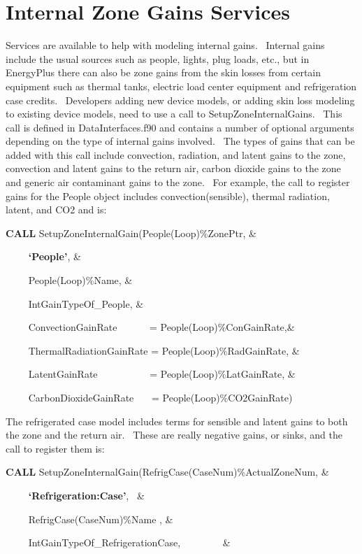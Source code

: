 \section{Internal Zone Gains Services}\label{internal-zone-gains-services}

Services are available to help with modeling internal gains.~ Internal gains include the usual sources such as people, lights, plug loads, etc., but in EnergyPlus there can also be zone gains from the skin losses from certain equipment such as thermal tanks, electric load center equipment and refrigeration case credits.~ Developers adding new device models, or adding skin loss modeling to existing device models, need to use a call to SetupZoneInternalGains.~ This call is defined in DataInterfaces.f90 and contains a number of optional arguments depending on the type of internal gains involved.~ The types of gains that can be added with this call include convection, radiation, and latent gains to the zone, convection and latent gains to the return air, carbon dioxide gains to the zone and generic air contaminant gains to the zone.~ For example, the call to register gains for the People object includes convection(sensible), thermal radiation, latent, and CO2 and is:

\textbf{CALL} SetupZoneInternalGain(People(Loop)\%ZonePtr, \&

~~~~ \textbf{`People'}, \&

~~~~ People(Loop)\%Name, \&

~~~~ IntGainTypeOf\_People, \&

~~~~ ConvectionGainRate~~~~~~ = People(Loop)\%ConGainRate,\&

~~~~ ThermalRadiationGainRate = People(Loop)\%RadGainRate, \&

~~~~ LatentGainRate~~~~~~~~~~ = People(Loop)\%LatGainRate, \&

~~~~ CarbonDioxideGainRate~~~ = People(Loop)\%CO2GainRate)

The refrigerated case model includes terms for sensible and latent gains to both the zone and the return air.~ These are really negative gains, or sinks, and the call to register them is:

\textbf{CALL} SetupZoneInternalGain(RefrigCase(CaseNum)\%ActualZoneNum, \&

~~~~ \textbf{`Refrigeration:Case'},~ \&

~~~~ RefrigCase(CaseNum)\%Name , \&

~~~~ IntGainTypeOf\_RefrigerationCase,~~~~~~~~ \&

